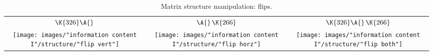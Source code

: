 \begin{table}[htdp]
\caption[Matrix structure manipulation: flips]{Matrix structure manipulation: flips.}
\begin{center}
\begin{tabular}{ccc}
%
  $\K{326} \A{}$ & $\A{} \, \K{266}$ & $\K{326} \A{} \, \K{266}$ \\[10pt]
%
  \texttt{[image: images/"information content I"/structure/"flip vert"]} &
  \texttt{[image: images/"information content I"/structure/"flip horz"]} &
  \texttt{[image: images/"information content I"/structure/"flip both"]} \\
%
\end{tabular}
\end{center}
\label{tab:structure:basics:flip}
\end{table}

\endinput